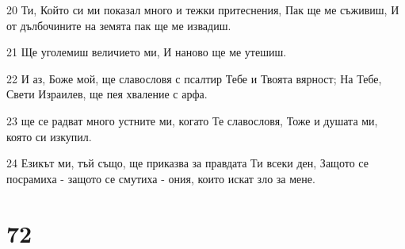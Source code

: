 \par 20 Ти, Който си ми показал много и тежки притеснения, Пак ще ме съживиш, И от дълбочините на земята пак ще ме извадиш.
\par 21 Ще уголемиш величието ми, И наново ще ме утешиш.
\par 22 И аз, Боже мой, ще славословя с псалтир Тебе и Твоята вярност; На Тебе, Свети Израилев, ще пея хваление с арфа.
\par 23 ще се радват много устните ми, когато Те славословя, Тоже и душата ми, която си изкупил.
\par 24 Езикът ми, тъй също, ще приказва за правдата Ти всеки ден, Защото се посрамиха - защото се смутиха - ония, които искат зло за мене.

\chapter{72}

